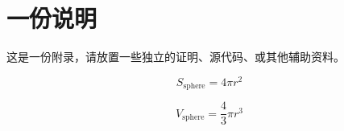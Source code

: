 \chapter{一份说明}

这是一份附录，请放置一些独立的证明、源代码、或其他辅助资料。

\begin{equation}
    S_{\text{sphere}} = 4 \pi r^2
\end{equation}

\begin{equation}
    V_{\text{sphere}} = \frac43 \pi r^3
\end{equation}
